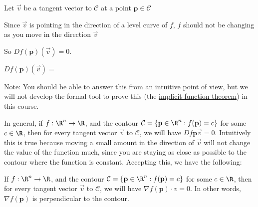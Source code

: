 \documentclass{ximera}
\begin{document}
\begin{question}
	Let $\vec{v}$ be a tangent vector to $\mathcal{C}$ at a point $\mathbf{p} \in \mathcal{C}$ 
	\begin{solution}
		\begin{hint}
			Since $\vec{v}$ is pointing in the direction of a level curve of $f$, $f$ should not be changing as you move in the direction $\vec{v}$
		\end{hint}
		\begin{hint}
			So $Df(\mathbf{p})(\vec{v}) = 0$.
		\end{hint}
		$Df(\mathbf{p})(\vec{v}) = $ 
		
		Note:  You should be able to answer this from an intuitive point of view, but we will not develop the formal tool to prove this 
	(the \href{http://en.wikipedia.org/wiki/Implicit_function_theorem}{implicit function theorem}) in this course.
	\end{solution}
	
	
\end{question}

In general, if $f:\R^n \to \R$, and the contour $\mathcal{C} = \{ \mathbf{p} \in \R^n :  f(\mathbf{p}) = c \}$ for some $c \in \R$, then for every tangent 
vector $\vec{v}$ to $\mathcal{C}$, we will have $Df{\mathbf{p}}{\vec{v}}  =0$.  
Intuitively this is true because moving a small amount in the direction of $\vec{v}$ will not change the value of the function much,
 since you are staying as close as possible to the contour where the function is constant.  Accepting this, we have the following:
 
 \begin{theorem}
  	If $f:\R^n \to \R$, and the contour $\mathcal{C} = \{ \mathbf{p} \in \R^n :  f(\mathbf{p}) = c \}$ for some $c \in \R$, then for every tangent 
vector $\vec{v}$ to $\mathcal{C}$, we will have $\nabla f(\mathbf{p}) \cdot v  =0$.  In other words, $\nabla f(\mathbf{p})$ is perpendicular to the 
contour.
 \end{theorem}
 
 
\end{document}
